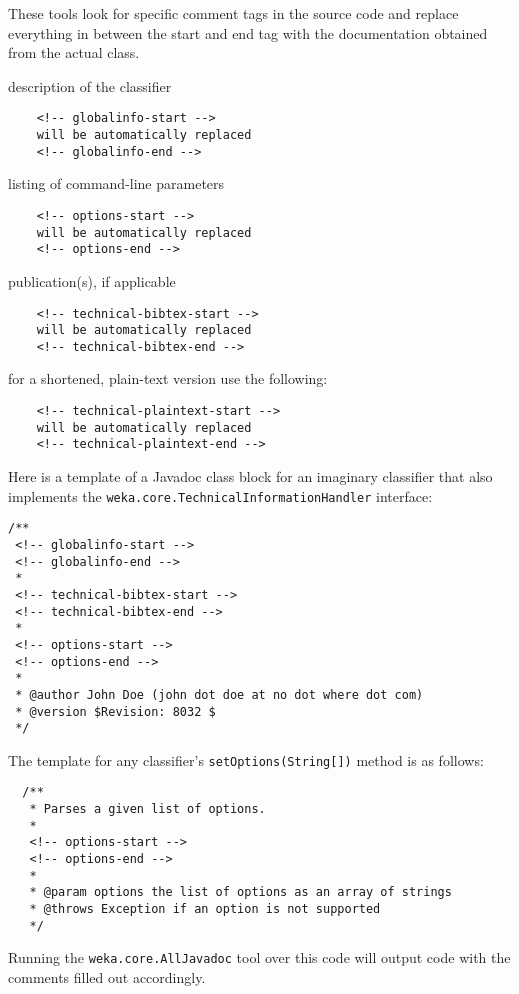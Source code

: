 These tools look for specific comment tags in the source code and replace
everything in between the start and end tag with the documentation obtained
from the actual class.
\begin{tight_itemize}
  \item description of the classifier
    \begin{verbatim}
    <!-- globalinfo-start -->
    will be automatically replaced
    <!-- globalinfo-end -->
    \end{verbatim}
  \item listing of command-line parameters
    \begin{verbatim}
    <!-- options-start -->
    will be automatically replaced
    <!-- options-end -->
   \end{verbatim}
  \item publication(s), if applicable
    \begin{verbatim}
    <!-- technical-bibtex-start -->
    will be automatically replaced
    <!-- technical-bibtex-end -->
    \end{verbatim}
    for a shortened, plain-text version use the following:
    \begin{verbatim}
    <!-- technical-plaintext-start -->
    will be automatically replaced
    <!-- technical-plaintext-end -->
   \end{verbatim}
\end{tight_itemize}

\newpage
\noindent Here is a template of a Javadoc class block for an imaginary
classifier that also implements the
\texttt{weka.core.TechnicalInformationHandler} interface:
\begin{verbatim}
/**
 <!-- globalinfo-start -->
 <!-- globalinfo-end -->
 *
 <!-- technical-bibtex-start -->
 <!-- technical-bibtex-end -->
 *
 <!-- options-start -->
 <!-- options-end -->
 *
 * @author John Doe (john dot doe at no dot where dot com)
 * @version $Revision: 8032 $
 */
\end{verbatim}
The template for any classifier's \texttt{setOptions(String[])} method
is as follows:
\begin{verbatim}
  /**
   * Parses a given list of options.
   *
   <!-- options-start -->
   <!-- options-end -->
   *
   * @param options the list of options as an array of strings
   * @throws Exception if an option is not supported
   */
\end{verbatim}
Running the \texttt{weka.core.AllJavadoc} tool over this code will output code
with the comments filled out accordingly.


